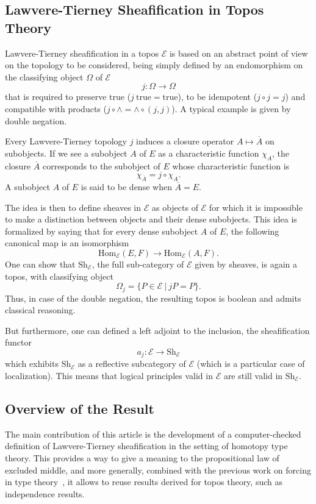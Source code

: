 \documentclass[conference]{IEEEtran}
\newcommand \True {\mathrm{true}}
\newcommand \closure[1] {\overline{#1}}
\newcommand \Char[1] {\chi_{#1}}%
\newcommand \E {\mathcal{E}}
\newcommand \Hom[1] {\mathrm{Hom}_{#1}}
\newcommand \Sh[1] {\mathrm{Sh}_{#1}}
\begin{document}
\subsection{Lawvere-Tierney Sheafification in Topos Theory}
\label{sec:lawv-tiern-sheaf}

Lawvere-Tierney sheafification in a topos $\E$ is based on an abstract
point of view on the topology to be considered, being simply defined by an
endomorphism on the classifying object $\Omega$ of $\E$  
%
$$
j : \Omega \rightarrow \Omega
$$
%
that is required to preserve $\True$ ($j \ \True = \True$), to be
idempotent ($j \circ j = j$) and compatible with products ($j \circ
\wedge = \wedge \circ (j, j)$).
%
A typical example is given by double negation.

Every Lawvere-Tierney topology $j$ induces a closure operator
$A \mapsto \closure{A}$ on subobjects. If we see a subobject $A$ of $E$
as a characteristic function $\Char{A}$, the closure $\closure{A}$
corresponds to the subobject of $E$ whose characteristic function is 
%
$$
\Char{\closure{A}} = j \circ \Char{A}.
$$
%
A subobject $A$ of $E$ is said to
be dense when $\closure{A} = E$.

The idea is then to define sheaves in $\E$ as objects of $\E$ for
which it is impossible to make a distinction between objects and their
dense subobjects. This idea is formalized by saying that for every
dense subobject $A$ of $E$, the following canonical map is an
isomorphism
%
\begin{equation}\label{equ:sheaf_def}
\Hom{\E}(E,F) \rightarrow \Hom{\E}(A,F).
\end{equation}
%
One can show that $\Sh{\E}$, the full sub-category of $\E$ given by
sheaves, is again a topos, with classifying object
%
$$
\Omega_j = \{ P \in \E \ | \ j P  = P \}.
$$
%
Thus, in case of the double negation, the resulting topos is boolean  
and admits classical reasoning.

But furthermore, one can defined a left adjoint to the inclusion, the
sheafification functor
%
$$
a_j : \E \rightarrow \Sh{\E}
$$
which exhibits $\Sh{\E}$ as a reflective
subcategory of $\E$ (which is a particular case of localization). This
means that logical principles valid in $\E$ are still valid in
$\Sh{\E}$.


\subsection{Overview of the Result}

The main contribution of this article is the development of a
computer-checked definition of Lawvere-Tierney sheafification in the
setting of homotopy type theory.
%
This provides a way to give a meaning to the propositional law of
excluded middle, and more generally, combined with the previous work on
forcing in type theory~\cite{jaber2012extending}, it allows to reuse
results derived for topos theory, such as independence results.
\end{document}
